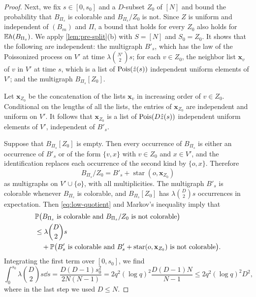 \begin{proof}
Next, we fix $s \in [0, s_0]$ and a $D$-subset $Z_0$ of $[N]$ and bound the probability that $B_{\Pi_s}$ is colorable and $B_{\Pi_s}/Z_0$ is not. Since $Z$ is uniform and independent of $(B_m)$ and $\Pi$, a bound that holds for every $Z_0$ also holds for $\mathbb E h(B_{\Pi_s})$.
We apply \cref{lem:pre-split}(b) with $S = [N]$ and $S_0 = Z_0$. It shows that the following are independent: the multigraph $B'_s$, which has the law of the Poissonized process on $V'$ at time $\lambda \binom{N'}{2} s$; for each $v \in Z_0$, the neighbor list $\mathbf x_v$ of $v$ in $V'$ at time $s$, which is a list of $\operatorname{Pois}(\hat z(s))$ independent uniform elements of $V'$; and the multigraph $B_{\Pi_s}[Z_0]$.

Let $\mathbf x_{Z_0}$ be the concatenation of the lists $\mathbf x_v$ in increasing order of $v \in Z_0$. Conditional on the lengths of all the lists, the entries of $\mathbf x_{Z_0}$ are independent and uniform on $V'$. It follows that $\mathbf x_{Z_0}$ is a list of $\operatorname{Pois}(D \hat z(s))$ independent uniform elements of $V'$, independent of $B'_s$.

Suppose that $B_{\Pi_s}[Z_0]$ is empty. Then every occurrence of $B_{\Pi_s}$ is either an occurrence of $B'_s$ or of the form $\{v, x\}$ with $v \in Z_0$ and $x \in V'$, and the identification replaces each occurrence of the second kind by $\{o, x\}$. Therefore
\begin{equation}\label{eq:low-quotient}
B_{\Pi_s}/Z_0 = B'_s + \operatorname{star}(o, \mathbf x_{Z_0})
\end{equation}
as multigraphs on $V' \cup \{o\}$, with all multiplicities. The multigraph $B'_s$ is colorable whenever $B_{\Pi_s}$ is colorable, and $B_{\Pi_s}[Z_0]$ has $\lambda \binom{D}{2} s$ occurrences in expectation. Then \eqref{eq:low-quotient} and Markov's inequality imply that
\begin{equation}\label{eq:low-split}
\begin{aligned}
&\mathbb P\bigl(B_{\Pi_s} \text{ is colorable and } B_{\Pi_s}/Z_0 \text{ is not colorable}\bigr) \\
&\le \lambda \binom{D}{2} s \\
&\quad + \mathbb P\bigl(B'_s \text{ is colorable and } B'_s + \operatorname{star}(o, \mathbf x_{Z_0}) \text{ is not colorable}\bigr).
\end{aligned}
\end{equation}
Integrating the first term over $[0, s_0]$, we find
\begin{equation}\label{eq:low-inside}
\int_0^{s_0} \lambda \binom{D}{2} s \dd s = \frac{D(D - 1) s_0^2}{2N(N - 1)} = 2q^2 (\log q)^2 \frac{D(D - 1) N}{N - 1} \le 2q^2 (\log q)^2 D^2,
\end{equation}
where in the last step we used $D \le N$.


\end{proof}
